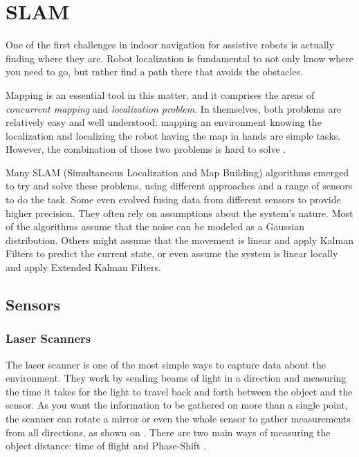 \chapter{SLAM}\label{chp:slam_mapping}

One of the first challenges in indoor navigation for assistive robots is actually finding where they are. Robot localization is fundamental to not only know where you need to go, but rather find a path there that avoids the obstacles.

Mapping is an essential tool in this matter, and it comprises the areas of \textit{concurrent mapping} and \textit{localization problem}. In themselves, both problems are relatively easy and well understood: mapping an environment knowing the localization and localizing the robot having the map in hands are simple tasks. However, the combination of those two problems is hard to solve \cite{thrun2000real}.

Many SLAM (Simultaneous Localization and
Map Building) algorithms emerged to try and solve these problems, using different approaches and a range of sensors to do the task. Some even evolved fusing data from different sensors to provide higher precision. They often rely on assumptions about the system's nature. Most of the algorithms assume that the noise can be modeled as a Gaussian distribution. Others might assume that the movement is linear and apply Kalman Filters to predict the current state, or even assume the system is linear locally and apply Extended Kalman Filters.

\section{Sensors}

\subsection{Laser Scanners}

The laser scanner is one of the most simple ways to capture data about the environment. They work by sending beams of light in a direction and measuring the time it takes for the light to travel back and forth between the object and the sensor. As you want the information to be gathered on more than a single point, the scanner can rotate a mirror or even the whole sensor to gather measurements from all directions, as shown on . There are two main ways of measuring the object distance: time of flight and Phase-Shift \cite{amann2001laser}.


